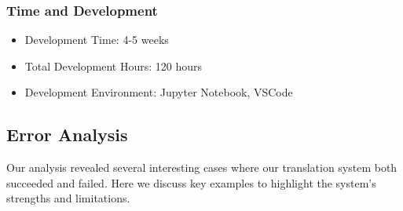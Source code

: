 \documentclass[11pt,a4paper]{article}
\begin{document}
\subsubsection{Time and Development}
\begin{itemize}[itemsep=0pt, topsep=0pt]
    \item Development Time: 4-5 weeks
    \item Total Development Hours: 120 hours
    \item Development Environment: Jupyter Notebook, VSCode
\end{itemize}

\subsection{Error Analysis}
Our analysis revealed several interesting cases where our translation system both succeeded and failed. Here we discuss key examples to highlight the system's strengths and limitations.
\end{document}
